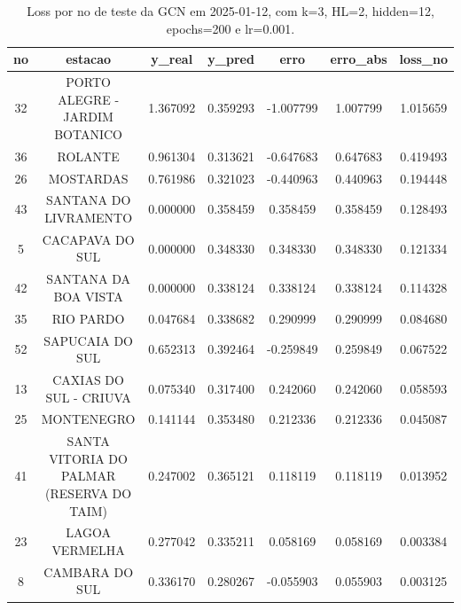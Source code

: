 \begin{table}[h]
\centering
\caption{Loss por no de teste da GCN em 2025-01-12, com k=3, HL=2, hidden=12, epochs=200 e lr=0.001.}
\label{tab:gcn_loss_k3_hl2_h12_e200_d20250112}
\begin{tabular}{ccccccc}
\toprule
no & estacao & y\_real & y\_pred & erro & erro\_abs & loss\_no \\
\midrule
32 & PORTO ALEGRE - JARDIM BOTANICO & 1.367092 & 0.359293 & -1.007799 & 1.007799 & 1.015659 \\
36 & ROLANTE & 0.961304 & 0.313621 & -0.647683 & 0.647683 & 0.419493 \\
26 & MOSTARDAS & 0.761986 & 0.321023 & -0.440963 & 0.440963 & 0.194448 \\
43 & SANTANA DO LIVRAMENTO & 0.000000 & 0.358459 & 0.358459 & 0.358459 & 0.128493 \\
5 & CACAPAVA DO SUL & 0.000000 & 0.348330 & 0.348330 & 0.348330 & 0.121334 \\
42 & SANTANA DA BOA VISTA & 0.000000 & 0.338124 & 0.338124 & 0.338124 & 0.114328 \\
35 & RIO PARDO & 0.047684 & 0.338682 & 0.290999 & 0.290999 & 0.084680 \\
52 & SAPUCAIA DO SUL & 0.652313 & 0.392464 & -0.259849 & 0.259849 & 0.067522 \\
13 & CAXIAS DO SUL - CRIUVA & 0.075340 & 0.317400 & 0.242060 & 0.242060 & 0.058593 \\
25 & MONTENEGRO & 0.141144 & 0.353480 & 0.212336 & 0.212336 & 0.045087 \\
41 & SANTA VITORIA DO PALMAR (RESERVA DO TAIM) & 0.247002 & 0.365121 & 0.118119 & 0.118119 & 0.013952 \\
23 & LAGOA VERMELHA & 0.277042 & 0.335211 & 0.058169 & 0.058169 & 0.003384 \\
8 & CAMBARA DO SUL & 0.336170 & 0.280267 & -0.055903 & 0.055903 & 0.003125 \\
\bottomrule
\end{tabular}
\end{table}
